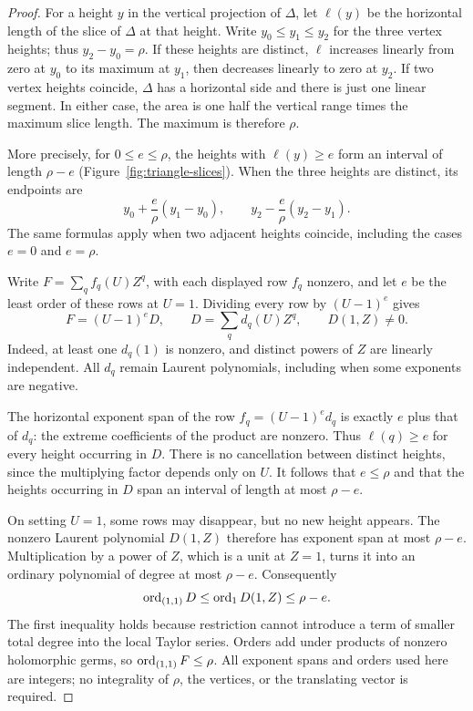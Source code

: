 \begin{proof}
For a height $y$ in the vertical projection of $\Delta$, let $\ell(y)$
be the horizontal length of the slice of $\Delta$ at that height.  Write
$y_0\leq y_1\leq y_2$ for the three vertex heights; thus
$y_2-y_0=\rho$.  If these heights are distinct, $\ell$ increases linearly
from zero at $y_0$ to its maximum at $y_1$, then decreases linearly to
zero at $y_2$.  If two vertex heights coincide, $\Delta$ has a horizontal
side and there is just one linear segment.  In either case, the area is
one half the vertical range times the maximum slice length.  The maximum
is therefore $\rho$.

More precisely, for $0\leq e\leq\rho$, the heights with
$\ell(y)\geq e$ form an interval of length $\rho-e$
(Figure~\ref{fig:triangle-slices}).  When the three
heights are distinct, its endpoints are
\[
 y_0+\frac e\rho(y_1-y_0),
 \qquad
 y_2-\frac e\rho(y_2-y_1).
\]
The same formulas apply when two adjacent heights coincide, including
the cases $e=0$ and $e=\rho$.

Write $F=\sum_q f_q(U)Z^q$, with each displayed row $f_q$ nonzero, and
let $e$ be the least order of these rows at $U=1$.  Dividing every row by
$(U-1)^e$ gives
\[
 F=(U-1)^eD,
 \qquad D=\sum_q d_q(U)Z^q,
 \qquad D(1,Z)\ne0.
\]
Indeed, at least one $d_q(1)$ is nonzero, and distinct powers of $Z$ are
linearly independent.  All $d_q$ remain Laurent polynomials, including
when some exponents are negative.

The horizontal exponent span of the row
$f_q=(U-1)^e d_q$ is exactly $e$ plus that of $d_q$: the extreme
coefficients of the product are nonzero.  Thus $\ell(q)\geq e$ for every
height occurring in $D$.  There is no cancellation between distinct
heights, since the multiplying factor depends only on $U$.  It follows
that $e\leq\rho$ and that the heights occurring in $D$ span an interval
of length at most $\rho-e$.

On setting $U=1$, some rows may disappear, but no new height appears.
The nonzero Laurent polynomial $D(1,Z)$ therefore has exponent span at
most $\rho-e$.  Multiplication by a power of $Z$, which is a unit at
$Z=1$, turns it into an ordinary polynomial of degree at most
$\rho-e$.  Consequently
\[
 \operatorname{ord}_{(1,1)}D
 \leq \operatorname{ord}_1 D(1,Z)
 \leq \rho-e.
\]
The first inequality holds because restriction cannot introduce a term
of smaller total degree into the local Taylor series.  Orders add under
products of nonzero holomorphic germs, so $\operatorname{ord}_{(1,1)}F\leq\rho$.
All exponent spans and orders used here are integers; no integrality of
$\rho$, the vertices, or the translating vector is required.
\end{proof}


